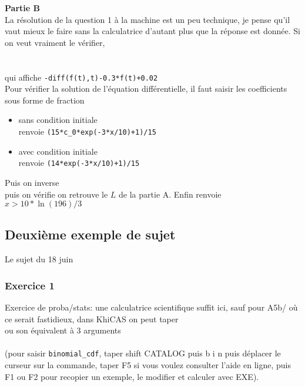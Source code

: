 \documentclass{article}
\begin{document}
\begin{giacjshere}
{\bf Partie B}\\
La résolution de la question 1 à la machine est un peu technique, 
je pense qu'il vaut mieux le faire sans la calculatrice 
d'autant plus que la réponse est donnée. Si on veut vraiment le vérifier,\\
\\
\\
qui affiche \verb|-diff(f(t),t)-0.3*f(t)+0.02|\\
Pour vérifier la solution de l'équation différentielle, il faut
saisir les coefficients sous forme de fraction
\begin{itemize}
\item sans condition initiale \\
 renvoie \verb|(15*c_0*exp(-3*x/10)+1)/15|
\item
avec condition initiale\\
renvoie \verb|(14*exp(-3*x/10)+1)/15|
\end{itemize}
Puis on inverse 
\\
puis on vérifie 
on retrouve le $L$ de la partie A. Enfin
  renvoie $x>10*\ln(196)/3$


\subsection{Deuxième exemple de sujet}
Le sujet du 18 juin

\subsubsection{Exercice 1}
Exercice de proba/stats: une calculatrice scientifique suffit ici, 
sauf pour A5b/ où ce serait fastidieux, dans KhiCAS on peut taper\\
ou son équivalent à 3 arguments \\
\\
(pour saisir {\tt binomial\_cdf}, taper shift CATALOG puis b i n
puis déplacer le curseur sur la commande, taper F5 si vous voulez
consulter l'aide en ligne, puis F1 ou F2 pour recopier un exemple,
le modifier et calculer avec EXE).


\end{giacjshere}
\end{document}
